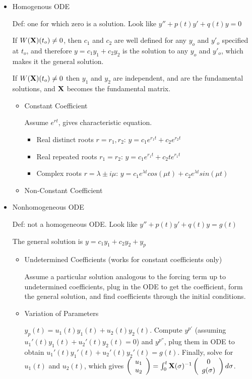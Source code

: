 \documentclass[11pt]{article}
\begin{document}
		\begin{itemize}
		\item Homogenous ODE 
		
		Def: one for which zero is a solution. Look like $y''+p(t)y'+q(t)y=0$
		
		If $W(\bold{X})(t_o)\neq 0$, then $c_1$ and $c_2$ are well defined for any $y_o$ and $y'_o$ specified at $t_o$, and therefore $y=c_1y_1+c_2y_2$ is the solution to any $y_o$ and $y'_o$, which makes it the general solution.
		
		If $W(\bold{X})(t_o)\neq 0$ then $y_1$ and $y_2$ are independent, and are the fundamental solutions, and $\bold{X}$ becomes the fundamental matrix.
		
		
			\begin{itemize}
			\item Constant Coefficient
			
			Assume $e^{rt}$, gives characteristic equation.
				\begin{itemize}
				\item Real distinct roots $r=r_1,r_2$: $y=c_1e^{r_1t}+c_2e^{r_2t}$
				\item Real repeated roots $r_1=r_2$: $y=c_1e^{r_1t}+c_2te^{r_1t}$
				\item Complex roots $r=\lambda \pm i\mu$: $y=c_1e^{\lambda t}cos(\mu t) + c_2 e^{\lambda t} sin(\mu t)$
				\end{itemize}
			\item Non-Constant Coefficient
			\end{itemize}
		\item Nonhomogeneous ODE  
		
		Def: not a homogeneous ODE. Look like $y''+p(t)y'+q(t)y=g(t)$
		
		The general solution is $y=c_1y_1+c_2y_2+y_p$
			\begin{itemize}
			\item Undetermined Coefficients (works for constant coefficients only)
			
			Assume a particular solution analogous to the forcing term up to undetermined coefficients, plug in the ODE to get the coefficient, form the general solution, and find coefficients through the initial conditions.
			\item Variation of Parameters
			
			$y_p(t)=u_1(t)y_1(t)+u_2(t)y_2(t)$. Compute $y^{p'}$ (assuming $u_1'(t)y_1(t)+u_2'(t)y_2(t)=0$) and $y^{p''}$, plug them in ODE to obtain $u_1'(t)y_1'(t)+u_2'(t)y_2'(t)=g(t)$. Finally, solve for $u_1(t)$ and $u_2(t)$, which gives $\left( \begin{array}{c}
u_1  \\
u_2  \end{array} \right)=\int_0^t\bold{X}(\sigma)^{-1}\left( \begin{array}{c}
0  \\
g(\sigma)  \end{array} \right)d\sigma $.
			\end{itemize}
		\end{itemize}
\end{document}
